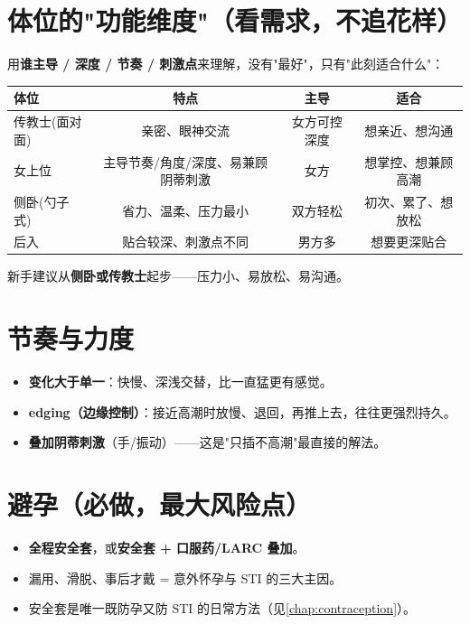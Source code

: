 \documentclass[12pt,UTF8,openany]{ctexbook}
\begin{document}
\section{体位的"功能维度"（看需求，不追花样）}

用\textbf{谁主导 / 深度 / 节奏 / 刺激点}来理解，没有"最好"，只有"此刻适合什么"：

\begin{tabularx}{\textwidth}{lCCC}
\toprule
体位 & 特点 & 主导 & 适合 \\
\midrule
传教士(面对面) & 亲密、眼神交流 & 女方可控深度 & 想亲近、想沟通 \\
女上位 & 主导节奏/角度/深度、易兼顾阴蒂刺激 & 女方 & 想掌控、想兼顾高潮 \\
侧卧(勺子式) & 省力、温柔、压力最小 & 双方轻松 & 初次、累了、想放松 \\
后入 & 贴合较深、刺激点不同 & 男方多 & 想要更深贴合 \\
\bottomrule
\end{tabularx}

\vspace{0.5em}
\noindent 新手建议从\textbf{侧卧或传教士}起步——压力小、易放松、易沟通。

\section{节奏与力度}

\begin{itemize}[leftmargin=2em,itemsep=0.3em]
  \item \textbf{变化大于单一}：快慢、深浅交替，比一直猛更有感觉。
  \item \textbf{edging（边缘控制）}：接近高潮时放慢、退回，再推上去，往往更强烈持久。
  \item \textbf{叠加阴蒂刺激}（手/振动）——这是"只插不高潮"最直接的解法。
\end{itemize}

\section{避孕（必做，最大风险点）}

\begin{itemize}[leftmargin=2em,itemsep=0.3em]
  \item \textbf{全程安全套}，或\textbf{安全套 + 口服药/LARC 叠加}。
  \item 漏用、滑脱、事后才戴 = 意外怀孕与 STI 的三大主因。
  \item 安全套是唯一既防孕又防 STI 的日常方法（见\ref{chap:contraception}）。
\end{itemize}
\end{document}
